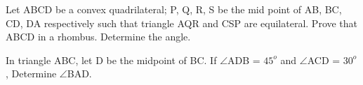 \item Let ABCD be a convex quadrilateral; P, Q, R, S be the mid point of AB, BC, CD, DA respectively such that triangle AQR and CSP are equilateral. Prove that ABCD in a rhombus. Determine the angle.

\item In triangle ABC, let D be the midpoint of BC. If $\angle$ADB = $45^{o}$ and $\angle$ACD = $30^{o}$, Determine 
$\angle$BAD.

